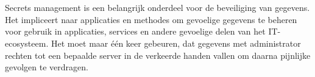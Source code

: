 
%
%

%



\chapter*{} 


Secrets management is een belangrijk onderdeel voor de beveiliging van gegevens. Het impliceert naar applicaties en methodes om gevoelige gegevens te beheren voor gebruik in applicaties, services en andere gevoelige delen van het IT-ecosysteem. Het moet maar één keer gebeuren, dat gegevens met administrator rechten tot een bepaalde server in de verkeerde handen vallen om daarna pijnlijke gevolgen te verdragen. 

